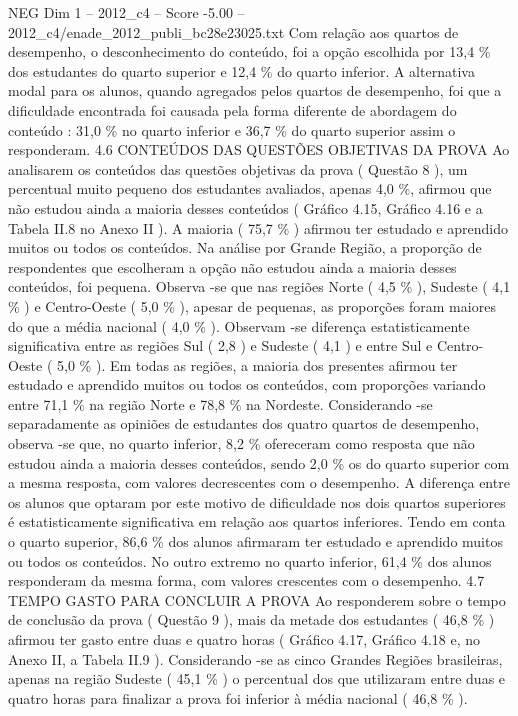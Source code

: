 \begin{textsample}{NEG Dim 1 – 2012\_c4 – Score -5.00 – 2012\_c4/enade\_2012\_publi\_bc28e23025.txt}
Com relação aos quartos de desempenho, o desconhecimento do conteúdo, foi a opção escolhida por 13,4 \% dos estudantes do quarto superior e 12,4 \% do quarto inferior.
A alternativa modal para os alunos, quando agregados pelos quartos de desempenho, foi que a dificuldade encontrada foi causada pela forma diferente de abordagem do conteúdo : 31,0 \% no quarto inferior e 36,7 \% do quarto superior assim o responderam. 4.6 CONTEÚDOS DAS QUESTÕES OBJETIVAS DA PROVA Ao analisarem os conteúdos das questões objetivas da prova ( Questão 8 ), um percentual muito pequeno dos estudantes avaliados, apenas 4,0 \%, afirmou que não estudou ainda a maioria desses conteúdos ( Gráfico 4.15, Gráfico 4.16 e a Tabela II.8 no Anexo II ).
A maioria ( 75,7 \% ) afirmou ter estudado e aprendido muitos ou todos os conteúdos.
Na análise por Grande Região, a proporção de respondentes que escolheram a opção não estudou ainda a maioria desses conteúdos, foi pequena.
Observa -se que nas regiões Norte ( 4,5 \% ), Sudeste ( 4,1 \% ) e Centro-Oeste ( 5,0 \% ), apesar de pequenas, as proporções foram maiores do que a média nacional ( 4,0 \% ).
Observam -se diferença estatisticamente significativa entre as regiões Sul ( 2,8 ) e Sudeste ( 4,1 ) e entre Sul e Centro-Oeste ( 5,0 \% ).
Em todas as regiões, a maioria dos presentes afirmou ter estudado e aprendido muitos ou todos os conteúdos, com proporções variando entre 71,1 \% na região Norte e 78,8 \% na Nordeste.
Considerando -se separadamente as opiniões de estudantes dos quatro quartos de desempenho, observa -se que, no quarto inferior, 8,2 \% ofereceram como resposta que não estudou ainda a maioria desses conteúdos, sendo 2,0 \% os do quarto superior com a mesma resposta, com valores decrescentes com o desempenho.
A diferença entre os alunos que optaram por este motivo de dificuldade nos dois quartos superiores é estatisticamente significativa em relação aos quartos inferiores.
Tendo em conta o quarto superior, 86,6 \% dos alunos afirmaram ter estudado e aprendido muitos ou todos os conteúdos.
No outro extremo no quarto inferior, 61,4 \% dos alunos responderam da mesma forma, com valores crescentes com o desempenho. 4.7 TEMPO GASTO PARA CONCLUIR A PROVA Ao responderem sobre o tempo de conclusão da prova ( Questão 9 ), mais da metade dos estudantes ( 46,8 \% ) afirmou ter gasto entre duas e quatro horas ( Gráfico 4.17, Gráfico 4.18 e, no Anexo II, a Tabela II.9 ).
Considerando -se as cinco Grandes Regiões brasileiras, apenas na região Sudeste ( 45,1 \% ) o percentual dos que utilizaram entre duas e quatro horas para finalizar a prova foi inferior à média nacional ( 46,8 \% ).

\end{textsample}
